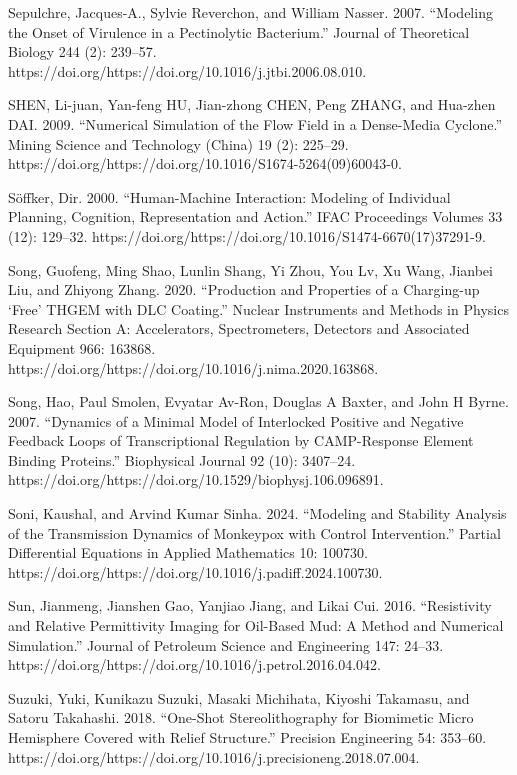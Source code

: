\documentclass[utf8]{gradu3}
\begin{document}
Sepulchre, Jacques-A., Sylvie Reverchon, and William Nasser. 2007. “Modeling the Onset of Virulence in a Pectinolytic Bacterium.” Journal of Theoretical Biology 244 (2): 239–57. https://doi.org/https://doi.org/10.1016/j.jtbi.2006.08.010.

SHEN, Li-juan, Yan-feng HU, Jian-zhong CHEN, Peng ZHANG, and Hua-zhen DAI. 2009. “Numerical Simulation of the Flow Field in a Dense-Media Cyclone.” Mining Science and Technology (China) 19 (2): 225–29. https://doi.org/https://doi.org/10.1016/S1674-5264(09)60043-0.

Söffker, Dir. 2000. “Human-Machine Interaction: Modeling of Individual Planning, Cognition, Representation and Action.” IFAC Proceedings Volumes 33 (12): 129–32. https://doi.org/https://doi.org/10.1016/S1474-6670(17)37291-9.

Song, Guofeng, Ming Shao, Lunlin Shang, Yi Zhou, You Lv, Xu Wang, Jianbei Liu, and Zhiyong Zhang. 2020. “Production and Properties of a Charging-up ‘Free’ THGEM with DLC Coating.” Nuclear Instruments and Methods in Physics Research Section A: Accelerators, Spectrometers, Detectors and Associated Equipment 966: 163868. https://doi.org/https://doi.org/10.1016/j.nima.2020.163868.

Song, Hao, Paul Smolen, Evyatar Av-Ron, Douglas A Baxter, and John H Byrne. 2007. “Dynamics of a Minimal Model of Interlocked Positive and Negative Feedback Loops of Transcriptional Regulation by CAMP-Response Element Binding Proteins.” Biophysical Journal 92 (10): 3407–24. https://doi.org/https://doi.org/10.1529/biophysj.106.096891.

Soni, Kaushal, and Arvind Kumar Sinha. 2024. “Modeling and Stability Analysis of the Transmission Dynamics of Monkeypox with Control Intervention.” Partial Differential Equations in Applied Mathematics 10: 100730. https://doi.org/https://doi.org/10.1016/j.padiff.2024.100730.

Sun, Jianmeng, Jianshen Gao, Yanjiao Jiang, and Likai Cui. 2016. “Resistivity and Relative Permittivity Imaging for Oil-Based Mud: A Method and Numerical Simulation.” Journal of Petroleum Science and Engineering 147: 24–33. https://doi.org/https://doi.org/10.1016/j.petrol.2016.04.042.

Suzuki, Yuki, Kunikazu Suzuki, Masaki Michihata, Kiyoshi Takamasu, and Satoru Takahashi. 2018. “One-Shot Stereolithography for Biomimetic Micro Hemisphere Covered with Relief Structure.” Precision Engineering 54: 353–60. https://doi.org/https://doi.org/10.1016/j.precisioneng.2018.07.004.
\end{document}
